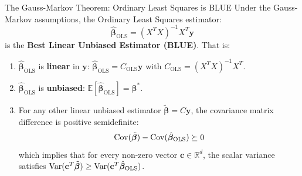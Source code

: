 \begin{theorembox}{The Gauss-Markov Theorem: Ordinary Least Squares is BLUE}
\label{thm:gauss_markov}
Under the Gauss-Markov assumptions, the Ordinary Least Squares estimator:
\begin{equation}
\hat{\boldsymbol{\beta}}_{\mathrm{OLS}} = (X^T X)^{-1} X^T \mathbf{y}
\end{equation}
is the \textbf{Best Linear Unbiased Estimator (BLUE)}. That is:
\begin{enumerate}
    \item $\hat{\boldsymbol{\beta}}_{\mathrm{OLS}}$ is \textbf{linear} in $\mathbf{y}$: $\hat{\boldsymbol{\beta}}_{\mathrm{OLS}} = C_{\mathrm{OLS}} \mathbf{y}$ with $C_{\mathrm{OLS}} = (X^T X)^{-1} X^T$.
    \item $\hat{\boldsymbol{\beta}}_{\mathrm{OLS}}$ is \textbf{unbiased}: $\mathbb{E}[\hat{\boldsymbol{\beta}}_{\mathrm{OLS}}] = \boldsymbol{\beta}^*$.
    \item For any other linear unbiased estimator $\tilde{\boldsymbol{\beta}} = C \mathbf{y}$, the covariance matrix difference is positive semidefinite:
    \begin{equation}
    \operatorname{Cov}(\tilde{\boldsymbol{\beta}}) - \operatorname{Cov}(\hat{\boldsymbol{\beta}}_{\mathrm{OLS}}) \succeq 0
    \label{eq:loewner_ordering}
    \end{equation}
    which implies that for every non-zero vector $\mathbf{c} \in \mathbb{R}^d$, the scalar variance satisfies $\operatorname{Var}(\mathbf{c}^T \tilde{\boldsymbol{\beta}}) \ge \operatorname{Var}(\mathbf{c}^T \hat{\boldsymbol{\beta}}_{\mathrm{OLS}})$.
\end{enumerate}
\end{theorembox}


